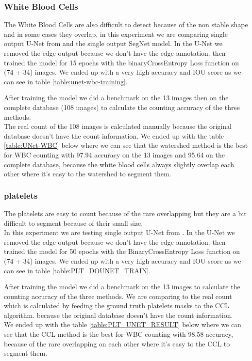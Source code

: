 \documentclass[conference]{IEEEtran}
\begin{document}
\subsubsection{White Blood Cells}
\hspace{\parindent}
The White Blood Cells are also difficult to detect because of the non stable shape and in some cases they overlap, in this experiment we are comparing single output U-Net from \cite{10.1007/978-3-030-44584-3_31} and the single output SegNet model.
In the U-Net we removed the edge output because we don't have the edge annotation. then trained the model for 15 epochs with the binaryCrossEntropy Loss function on (74 + 34) images. 
We ended up with a very high accuracy and IOU score as we can see in table \ref{table:unet-wbc-training}.

After training the model we did a benchmark on the 13 images then on the complete database (108 images) to calculate the counting accuracy of the three methods.\\ 
The real count of the 108 images is calculated manually because the original database doesn't have the count information. We ended up with the table \ref{table:UNet-WBC} below where we can see that the watershed method is the best for WBC counting with 97.94 accuracy on the 13 images and 95.64 on the complete database, because the white blood cells always slightly overlap each other where it's easy to the watershed to segment them.

\subsubsection{platelets}
\hspace{\parindent}
The platelets are easy to count because of the rare overlapping but they are a bit difficult to segment because of their small size.\\
In this experiment we are testing single output U-Net from \cite{10.1007/978-3-030-44584-3_31}. In the U-Net we removed the edge output because we don’t have the edge annotation.
then trained the model for 50 epochs with the BinaryCrossEntropy Loss function on (74 + 34) images.
We ended up with a very high accuracy and IOU score as we can see in table \ref{table:PLT_DOUNET_TRAIN}.

After training the model we did a benchmark on the 13 images to calculate the counting accuracy of the three methods.
We are comparing to the real count which is calculated by feeding the ground truth platelets masks to the CCL algorithm. because the original database doesn't have the count information.\\
We ended up with the table \ref{table:PLT_UNET_RESULT} below where we can see that the CCL method is the best for WBC counting with 98.58 accuracy, because of the rare overlapping on each other where it’s easy to the CCL to segment them.
\end{document}
